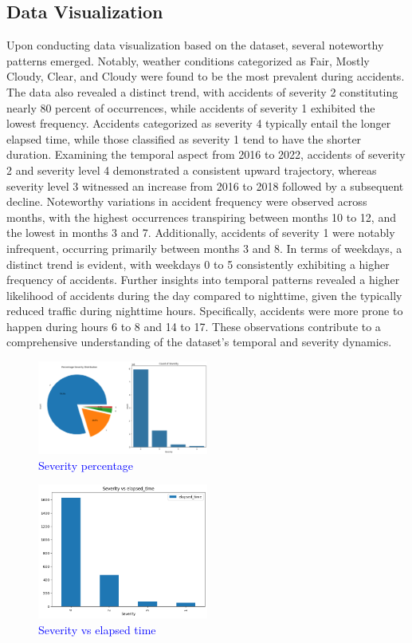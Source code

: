 \documentclass[10pt,twocolumn,letterpaper]{article}
\begin{document}
\begin{CJK}{UTF8}{bsmi}
\subsection{Data Visualization}
Upon conducting data visualization based on the dataset, several noteworthy patterns emerged. Notably, weather conditions categorized as Fair, Mostly Cloudy, Clear, and Cloudy were found to be the most prevalent during accidents. The data also revealed a distinct trend, with accidents of severity 2 constituting nearly 80 percent of occurrences, while accidents of severity 1 exhibited the lowest frequency. Accidents categorized as severity 4 typically entail the longer elapsed time, while those classified as severity 1 tend to have the shorter duration.
Examining the temporal aspect from 2016 to 2022, accidents of severity 2 and severity level 4 demonstrated a consistent upward trajectory, whereas severity level 3 witnessed an increase from 2016 to 2018 followed by a subsequent decline. Noteworthy variations in accident frequency were observed across months, with the highest occurrences transpiring between months 10 to 12, and the lowest in months 3 and 7. Additionally, accidents of severity 1 were notably infrequent, occurring primarily between months 3 and 8. In terms of weekdays, a distinct trend is evident, with weekdays 0 to 5 consistently exhibiting a higher frequency of accidents. Further insights into temporal patterns revealed a higher likelihood of accidents during the day compared to nighttime, given the typically reduced traffic during nighttime hours. Specifically, accidents were more prone to happen during hours 6 to 8 and 14 to 17. These observations contribute to a comprehensive understanding of the dataset's temporal and severity dynamics.

\begin{figure}[h]
    \centering
    \includegraphics[width=0.5\textwidth]{graph1.png}
    \caption{\textcolor{blue}{Severity percentage}}
    \label{Fig.1}
\end{figure}

\begin{figure}[h]
    \centering
    \includegraphics[width=0.5\textwidth]{graph2.png}
    \caption{\textcolor{blue}{Severity vs elapsed time}}
    \label{Fig.2}
\end{figure}


\end{CJK}
\end{document}
